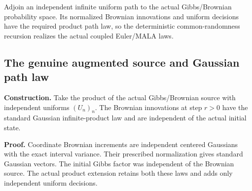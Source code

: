\documentclass[11pt,a4paper]{report}
\begin{document}
Adjoin an independent infinite uniform path to the actual Gibbs/\allowbreak{}Brownian probability space. Its normalized Brownian innovations and uniform decisions have the required product path law, so the deterministic common-randomness recursion realizes the actual coupled Euler/\allowbreak{}MALA laws.

\subsection{\texorpdfstring{The genuine augmented source and Gaussian path law}{The genuine augmented source and Gaussian path law}}
\label{report-step-WassersteinMixing-SemigroupRandomMALACanonical-lean-1}


\textbf{Construction.} Take the product of the actual Gibbs/\allowbreak{}Brownian source with independent uniforms \((U_n)_n\). The Brownian innovations at step \(r>0\) have the standard Gaussian infinite-product law and are independent of the actual initial state.



\textbf{Proof.} Coordinate Brownian increments are independent centered Gaussians with the exact interval variance. Their prescribed normalization gives standard Gaussian vectors. The initial Gibbs factor was independent of the Brownian source. The actual product extension retains both these laws and adds only independent uniform decisions.
\end{document}
